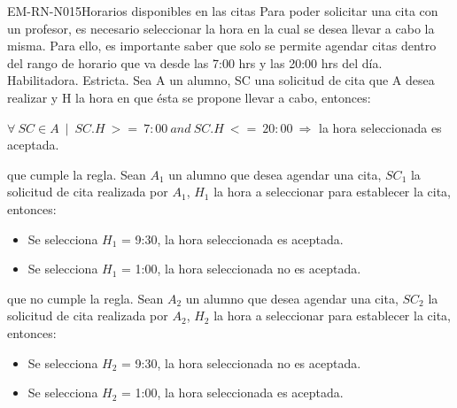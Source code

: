 \begin{BussinesRule}{EM-RN-N015}{Horarios disponibles en las citas}
	\BRitem[Descripción:] Para poder solicitar una cita con un profesor, es necesario seleccionar la hora en la cual se desea llevar a cabo la misma. Para ello, es importante saber que solo se permite agendar citas dentro del rango de horario que va desde las 7:00 hrs y las 20:00 hrs del día.  
	\BRitem[Tipo: ] Habilitadora.
	\BRitem[Nivel: ] Estricta.
	\BRitem[Sentencia : ] Sea A un alumno, SC una solicitud de cita que A desea realizar y H la hora en que ésta se propone llevar a cabo, entonces:
	\begin{center}
		$\forall \: SC \in A \: \mid \: SC.H \: >= \: 7:00 \: and \: SC.H \: <= \: 20:00 \: \Rightarrow$ la hora seleccionada es aceptada.
	\end{center}
	 que cumple la regla.
		Sean $A_{1}$ un alumno que desea agendar una cita, $SC_{1}$ la solicitud de cita realizada por $A_{1}$, $H_{1}$ la hora a seleccionar para establecer la cita, entonces:
		\begin{itemize}
			\item Se selecciona $H_{1}$ = 9:30, la hora seleccionada es aceptada.
			\item Se selecciona $H_{1}$ = 1:00, la hora seleccionada no es aceptada.
		\end{itemize}
	 que no cumple la regla.
		Sean $A_{2}$ un alumno que desea agendar una cita, $SC_{2}$ la solicitud de cita realizada por $A_{2}$, $H_{2}$ la hora a seleccionar para establecer la cita, entonces:
		\begin{itemize}
			\item Se selecciona $H_{2}$ = 9:30, la hora seleccionada no es aceptada.
			\item Se selecciona $H_{2}$ = 1:00, la hora seleccionada es aceptada.
		\end{itemize}

\end{BussinesRule}

